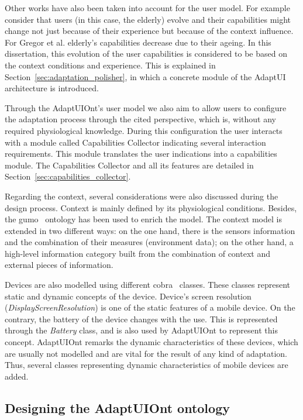 Other works have also been taken into account for the user model. For example
~\citet{gregor_designing_2002} consider that users (in this case, the elderly)
evolve and their capabilities might change not just because of their experience
but because of the context influence. For Gregor et al. elderly's capabilities
decrease due to their ageing. In this dissertation, this evolution of the user
capabilities is considered to be based on the context conditions and experience.
This is explained in Section~\ref{sec:adaptation_polisher}, in which a concrete
module of the AdaptUI architecture is introduced.

Through the AdaptUIOnt's user model we also aim to allow users to configure
the adaptation process through the cited perspective, which is, without any required
physiological knowledge. During this configuration the user interacts with a
module called Capabilities Collector indicating several interaction requirements.
This module translates the user indications into a capabilities module. The
Capabilities Collector and all its features are detailed in
Section~\ref{sec:capabilities_collector}.

Regarding the context, several considerations were also discussed during the design
process. Context is mainly defined by its physiological conditions. Besides,
the \ac{gumo}~\citep{heckmann_gumogeneral_2005} ontology has been used to enrich the
model. The context model is extended in two different ways: on the one hand,
there is the sensors information and the combination of their measures (environment
data); on the other hand, a high-level information category built from the
combination of context and external pieces of information.

Devices are also modelled using different \ac{cobra}~\citep{cobra} classes. These
classes represent static and dynamic concepts of the device. Device's screen
resolution (\textit{DisplayScreenResolution}) is one of the static features of a
mobile device. On the contrary, the battery of the device changes with the use.
This is represented through the \textit{Battery} class, and is also used by
AdaptUIOnt to represent this concept. AdaptUIOnt remarks the dynamic characteristics
of these devices, which are usually not modelled and are vital for the result of
any kind of adaptation. Thus, several classes representing dynamic characteristics
of mobile devices are added.



\subsection{Designing the AdaptUIOnt ontology}
\label{sec:model_detail}


